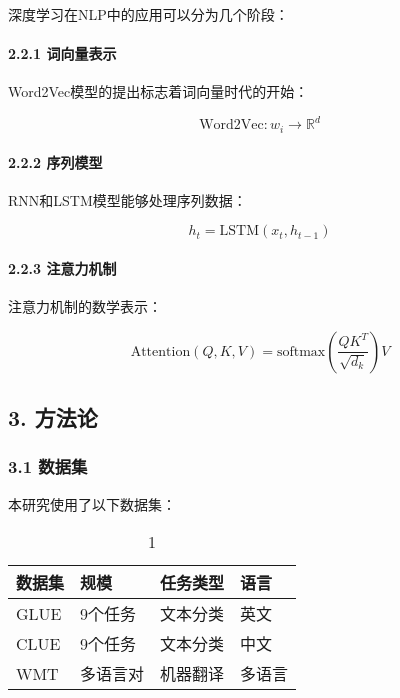 \documentclass[UTF8, a4paper, 11pt]{ctexart}
\begin{document}
深度学习在NLP中的应用可以分为几个阶段：


\paragraph{2.2.1 词向量表示}

Word2Vec模型的提出标志着词向量时代的开始：


\begin{equation}
\text{Word2Vec}: w_i \rightarrow \mathbb{R}^d
\label{eq:equation<counter>}
\end{equation}


\paragraph{2.2.2 序列模型}

RNN和LSTM模型能够处理序列数据：


\begin{equation}
h_t = \text{LSTM}(x_t, h_{t-1})
\label{eq:equation<counter>}
\end{equation}


\paragraph{2.2.3 注意力机制}

注意力机制的数学表示：


\begin{equation}
\text{Attention}(Q, K, V) = \text{softmax}\left(\frac{QK^T}{\sqrt{d_k}}\right)V
\label{eq:equation<counter>}
\end{equation}


\subsection{3. 方法论}


\subsubsection{3.1 数据集}


本研究使用了以下数据集：


\begin{table}[htbp]
    \centering
    \caption{1}
    \label{tab:table1}
    \begin{tabular}{|l|l|l|l|}
        \toprule
        \textbf{数据集} & \textbf{规模} & \textbf{任务类型} & \textbf{语言} \\
        \midrule
        GLUE & 9个任务 & 文本分类 & 英文 \\
        CLUE & 9个任务 & 文本分类 & 中文 \\
        WMT & 多语言对 & 机器翻译 & 多语言 \\
        \bottomrule
    \end{tabular}
\end{table}
\end{document}
